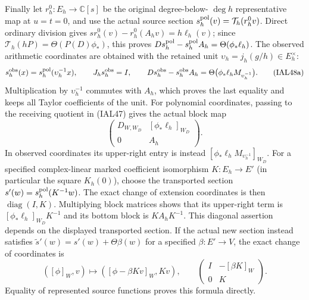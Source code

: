 \documentclass[11pt,a4paper]{article}
\theoremstyle{definition}
\begin{document}
Finally let $r_h^0:E_h\to\mathbb C[s]$ be the original degree-below-
$\deg h$ representative map at $u=t=0$, and use the actual source
section $s_h^{\rm pol}(v)=\mathcal T_h(r_h^0v)$.  Direct ordinary
division gives $s r_h^0(v)-r_h^0(A_hv)=h\ell_h(v)$; since
$\mathcal T_h(hP)=\Theta(P(D)\phi_*)$, this proves
$Ds_h^{\rm pol}-s_h^{\rm pol}A_h=\Theta(\phi_*\ell_h)$.
The observed arithmetic coordinates are obtained with the retained
unit $\upsilon_h=j_h(g/h)\in E_h^\times$:
\begin{equation}
 s_h^{\rm obs}(x)=s_h^{\rm pol}(\upsilon_h^{-1}x),\qquad
 J_hs_h^{\rm obs}=I,\qquad
 Ds_h^{\rm obs}-s_h^{\rm obs}A_h
 =\Theta\bigl(\phi_*\ell_h M_{\upsilon_h^{-1}}\bigr).
                                                        \tag{IAL48a}
\end{equation}
Multiplication by $\upsilon_h^{-1}$ commutes with $A_h$, which proves
the last equality and keeps all Taylor coefficients of the unit.
For polynomial coordinates, passing to the receiving quotient in
(IAL47) gives the actual block map
\begin{equation}
 \begin{pmatrix}D_{W,W_D}&[\phi_*\ell_h]_{W_D}\\0&A_h\end{pmatrix}.
                                                        \tag{IAL48}
\end{equation}
In observed coordinates its upper-right entry is instead
$[\phi_*\ell_h M_{\upsilon_h^{-1}}]_{W_D}$.
For a specified complex-linear marked coefficient isomorphism
$K:E_h\to E'$ (in particular the square $K_h(0)$), choose the
transported section
$s'(w)=s_h^{\rm pol}(K^{-1}w)$.  The exact change of extension
coordinates is then $\operatorname{diag}(I,K)$.  Multiplying block
matrices shows that its upper-right term is
$[\phi_*\ell_h]_{W_D}K^{-1}$ and its bottom block is $KA_hK^{-1}$.
This diagonal assertion depends on the displayed transported section.
If the actual new section instead satisfies
$\widetilde s'(w)=s'(w)+\Theta\beta(w)$ for a specified
$\beta:E'\to V$, the exact change of coordinates is
\begin{equation}
 ([\phi]_W,v)\longmapsto
       ([\phi-\beta Kv]_W,Kv),\qquad
 \begin{pmatrix}I&-[\beta K]_W\\0&K\end{pmatrix}.
                                                        \tag{IAL49}
\end{equation}
Equality of represented source functions proves this formula directly.
\end{document}
